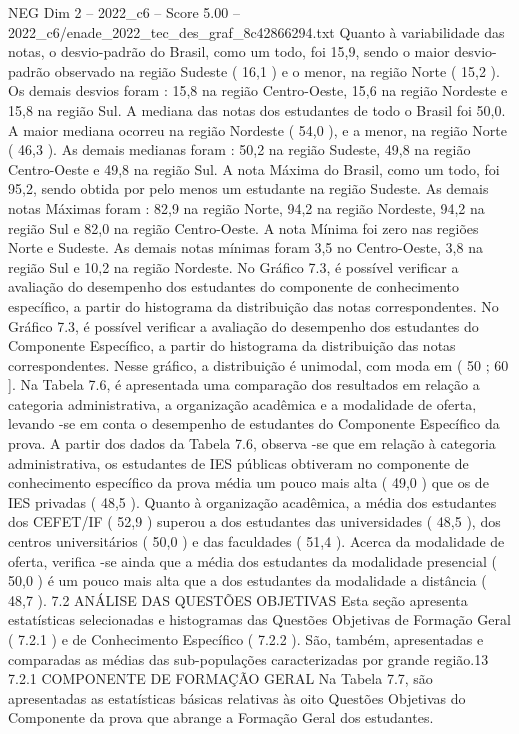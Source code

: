 \begin{textsample}{NEG Dim 2 – 2022\_c6 – Score 5.00 – 2022\_c6/enade\_2022\_tec\_des\_graf\_8c42866294.txt}
Quanto à variabilidade das notas, o desvio-padrão do Brasil, como um todo, foi 15,9, sendo o maior desvio-padrão observado na região Sudeste ( 16,1 ) e o menor, na região Norte ( 15,2 ).
Os demais desvios foram : 15,8 na região Centro-Oeste, 15,6 na região Nordeste e 15,8 na região Sul.
A mediana das notas dos estudantes de todo o Brasil foi 50,0.
A maior mediana ocorreu na região Nordeste ( 54,0 ), e a menor, na região Norte ( 46,3 ).
As demais medianas foram : 50,2 na região Sudeste, 49,8 na região Centro-Oeste e 49,8 na região Sul.
A nota Máxima do Brasil, como um todo, foi 95,2, sendo obtida por pelo menos um estudante na região Sudeste.
As demais notas Máximas foram : 82,9 na região Norte, 94,2 na região Nordeste, 94,2 na região Sul e 82,0 na região Centro-Oeste.
A nota Mínima foi zero nas regiões Norte e Sudeste.
As demais notas mínimas foram 3,5 no Centro-Oeste, 3,8 na região Sul e 10,2 na região Nordeste.
No Gráfico 7.3, é possível verificar a avaliação do desempenho dos estudantes do componente de conhecimento específico, a partir do histograma da distribuição das notas correspondentes.
No Gráfico 7.3, é possível verificar a avaliação do desempenho dos estudantes do Componente Específico, a partir do histograma da distribuição das notas correspondentes.
Nesse gráfico, a distribuição é unimodal, com moda em ( 50 ; 60 ].
Na Tabela 7.6, é apresentada uma comparação dos resultados em relação a categoria administrativa, a organização acadêmica e a modalidade de oferta, levando -se em conta o desempenho de estudantes do Componente Específico da prova.
A partir dos dados da Tabela 7.6, observa -se que em relação à categoria administrativa, os estudantes de IES públicas obtiveram no componente de conhecimento específico da prova média um pouco mais alta ( 49,0 ) que os de IES privadas ( 48,5 ).
Quanto à organização acadêmica, a média dos estudantes dos CEFET/IF ( 52,9 ) superou a dos estudantes das universidades ( 48,5 ), dos centros universitários ( 50,0 ) e das faculdades ( 51,4 ).
Acerca da modalidade de oferta, verifica -se ainda que a média dos estudantes da modalidade presencial ( 50,0 ) é um pouco mais alta que a dos estudantes da modalidade a distância ( 48,7 ). 7.2 ANÁLISE DAS QUESTÕES OBJETIVAS Esta seção apresenta estatísticas selecionadas e histogramas das Questões Objetivas de Formação Geral ( 7.2.1 ) e de Conhecimento Específico ( 7.2.2 ).
São, também, apresentadas e comparadas as médias das sub-populações caracterizadas por grande região.13 7.2.1 COMPONENTE DE FORMAÇÃO GERAL Na Tabela 7.7, são apresentadas as estatísticas básicas relativas às oito Questões Objetivas do Componente da prova que abrange a Formação Geral dos estudantes.

\end{textsample}
